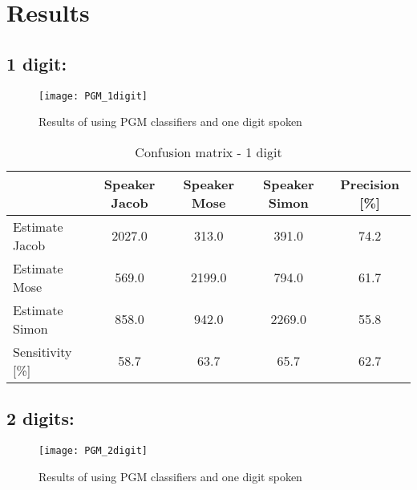 \section{Results}

\subsection{1 digit:}

\begin{figure}[H]
\centering
\texttt{[image: PGM\_1digit]}
\caption{Results of using PGM classifiers and one digit spoken}
\label{fig:PGM_1dig}
\end{figure}

\begin{table}[H]                                                    
\centering                                                          
\begin{tabular}{|l|c|c|c|c|}                                        
\hline                                                              
  & Speaker Jacob & Speaker Mose & Speaker Simon & Precision [\%] \\
\hline                                                              
Estimate Jacob & 2027.0 & 313.0 & 391.0 & 74.2 \\                   
\hline                                                              
Estimate Mose & 569.0 & 2199.0 & 794.0 & 61.7 \\                    
\hline                                                              
Estimate Simon & 858.0 & 942.0 & 2269.0 & 55.8 \\                   
\hline                                                              
Sensitivity [\%] & 58.7 & 63.7 & 65.7 & 62.7 \\                     
\hline                                                              
\end{tabular}                                                       
\caption{Confusion matrix - 1 digit}                                
\label{table:PGM_conf_1}                                            
\end{table}       


\subsection{2 digits:}

\begin{figure}[H]
\centering
\texttt{[image: PGM\_2digit]}
\caption{Results of using PGM classifiers and one digit spoken}
\label{fig:PGM_2dig}
\end{figure}

